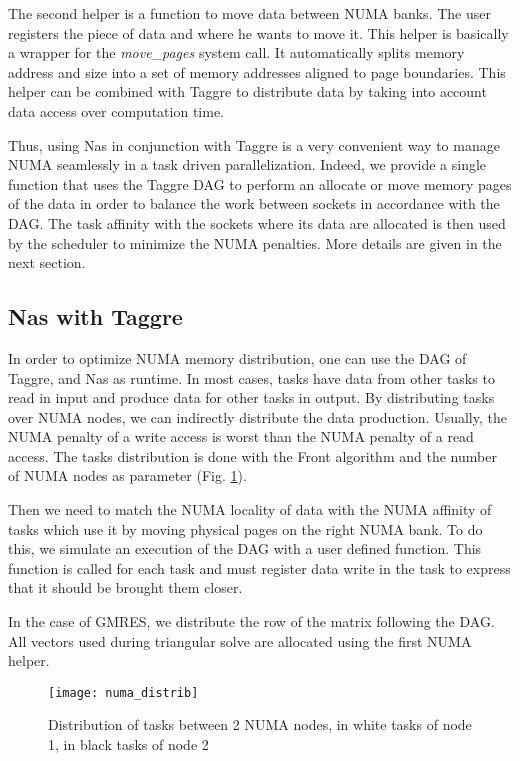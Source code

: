 The second helper is a function to move data between NUMA banks.
%
The user registers the piece of data and where he wants to move it.
%
This helper is basically a wrapper for the {\em move\_pages} system call.
%
It automatically splits memory address and size into
a set of memory addresses aligned to page boundaries.
%
This helper can be combined with Taggre to distribute data by taking into account data access over computation time.


Thus, using Nas in conjunction with Taggre is a very convenient way to manage NUMA seamlessly in a task driven parallelization.
%
Indeed, we provide a single function that uses the Taggre DAG to perform an allocate or move memory pages of the data in order to balance the work between sockets in accordance with the DAG.
%
The task affinity with the sockets where its data are allocated is then used by the scheduler to minimize the NUMA penalties.
%
More details are given in the next section.

\subsection{Nas with Taggre}
In order to optimize NUMA memory distribution, one can use the DAG of Taggre, and Nas as runtime.
%
In most cases, tasks have data from other tasks to read in input and produce data for other tasks in output.
%
By distributing tasks over NUMA nodes, we can indirectly distribute
the data production.
%
Usually, the NUMA penalty of a write access is worst than the NUMA penalty of a read access.
%
The tasks distribution is done with the Front algorithm
and the number of NUMA nodes as parameter (Fig. \ref{fig:distrib_numa}).

Then we need to match the NUMA locality of data with the NUMA affinity of tasks which use it by moving physical pages on the right NUMA bank.
%
To do this, we simulate an execution of the DAG with a user defined function.
%
This function is called for each task and must register data write in the task to express that it should be brought them closer.

In the case of GMRES, we distribute the row of the matrix following the DAG.
%
All vectors used during triangular solve are allocated using the first NUMA helper.


\begin{figure}[!ht]
  \centering
  \texttt{[image: numa\_distrib]}
  \caption{Distribution of tasks between 2 NUMA nodes, in white tasks of node 1, in black tasks of node 2}
  \label{fig:distrib_numa}
\end{figure}

